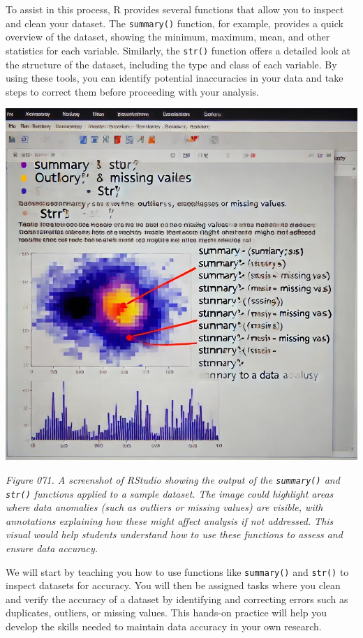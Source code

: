 \documentclass[
]{book}
\begin{document}
To assist in this process, R provides several functions that allow you to inspect and clean your dataset. The \texttt{summary()} function, for example, provides a quick overview of the dataset, showing the minimum, maximum, mean, and other statistics for each variable. Similarly, the \texttt{str()} function offers a detailed look at the structure of the dataset, including the type and class of each variable. By using these tools, you can identify potential inaccuracies in your data and take steps to correct them before proceeding with your analysis.

\includegraphics[width=1\textwidth,height=\textheight]{images/fig071.jpg}

\emph{Figure 071. A screenshot of RStudio showing the output of the \texttt{summary()} and \texttt{str()} functions applied to a sample dataset. The image could highlight areas where data anomalies (such as outliers or missing values) are visible, with annotations explaining how these might affect analysis if not addressed. This visual would help students understand how to use these functions to assess and ensure data accuracy.}

We will start by teaching you how to use functions like \texttt{summary()} and \texttt{str()} to inspect datasets for accuracy. You will then be assigned tasks where you clean and verify the accuracy of a dataset by identifying and correcting errors such as duplicates, outliers, or missing values. This hands-on practice will help you develop the skills needed to maintain data accuracy in your own research.
\end{document}
